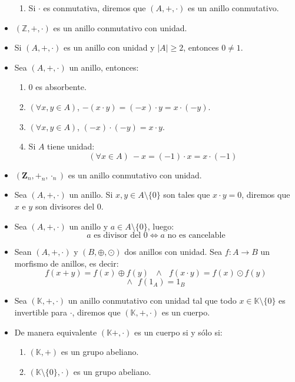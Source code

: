 \documentclass[letterpaper,10pt]{article}
\newcommand{\Z}{\mathbb Z}
\newcommand{\K}{\mathbb K}
\newcommand{\ssi}{\Longleftrightarrow} %
\theoremstyle{plain}
\begin{document}
\begin{framed}
\begin{multicols}{2}
\begin{itemize}
\begin{enumerate}
                    \item Si $\cdot$ es conmutativa, diremos que $(A,+,\cdot)$ es un anillo conmutativo.
                \end{enumerate}
            \item $(\Z, +,\cdot)$ es un anillo conmutativo con unidad.
            \item Si $(A,+,\cdot)$ es un anillo con unidad y $|A|\geq 2$, entonces $0 \neq 1$.
            \item Sea $(A,+,\cdot)$ un anillo, entonces:
                \begin{enumerate}
                	\item 0 es absorbente.
                	\item $(\forall x,y \in A)$, $-(x \cdot y)=(-x)\cdot y = x \cdot (-y)$.
                	\item $(\forall x,y \in A)$, $(-x)\cdot (-y)= x \cdot y$.
                	\item Si $A$ tiene unidad:
                	$$
                	(\forall x \in A) \: -x=(-1)\cdot x = x  \cdot (-1)
                	$$
                \end{enumerate}
            \item $(\mathbf Z_n,+_n, \cdot_n)$ es un anillo conmutativo con unidad.
            \item Sea $(A,+,\cdot)$ un anillo. Si $x,y \in A\setminus \{0\}$ son tales que $x \cdot y=0$, diremos que $x$ e $y$ son divisores del 0.
            \item Sea $(A,+,\cdot)$ un anillo y $a \in A\setminus \{0\}$, luego:
            $$
            a \text{ es divisor del 0}\ssi a \text{ no es cancelable}
            $$
            \item Sean $(A,+,\cdot)$ y $(B,\oplus, \odot)$ dos anillos con unidad. Sea $f: A \to B$ un morfismo de anillos, es decir:
            $$	f(x+ y)=f(x)\oplus f(y) ~~~\land~~~ f(x \cdot y)=f(x ) \odot f(y)$$
            $$ \land~~~ f(1_A)=1_B  $$
            \item Sea $(\K,+, \cdot )$ un anillo conmutativo con unidad tal que todo $x \in \K \setminus \{0\}$ es invertible para $\cdot$, diremos que $(\K,+, \cdot )$ es un cuerpo.
            \item De manera equivalente $(\K+,\cdot) $ es un cuerpo si y sólo si:
                \begin{enumerate}
                    \item $(\K,+)$ es un grupo abeliano.
                    \item $(\K \setminus \{0\}, \cdot)$ es un grupo abeliano.

\end{enumerate}
\end{itemize}
\end{multicols}
\end{framed}
\end{document}
